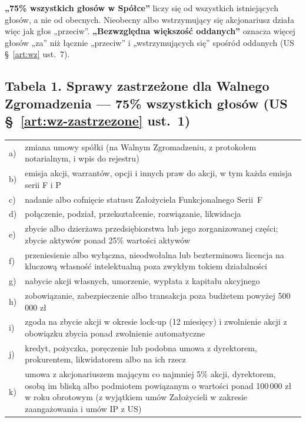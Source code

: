 \documentclass[11pt,a4paper]{report}
\begin{document}
\begin{Zasada}
\textbf{„75\% wszystkich głosów w Spółce”} liczy się od wszystkich istniejących głosów, a nie od obecnych. Nieobecny albo wstrzymujący się akcjonariusz działa więc jak głos „przeciw”. \textbf{„Bezwzględna większość oddanych”} oznacza więcej głosów „za” niż łącznie „przeciw” i „wstrzymujących się” spośród oddanych (US §~\ref{art:wz} ust.~7).
\end{Zasada}

\subsection*{Tabela 1. Sprawy zastrzeżone dla Walnego Zgromadzenia --- 75\% wszystkich głosów (US §~\ref{art:wz-zastrzezone} ust.~1)}
\begin{tabularx}{\linewidth}{@{}p{0.6cm} X@{}}
\toprule
a) & zmiana umowy spółki (na Walnym Zgromadzeniu, z protokołem notarialnym, i wpis do rejestru) \\
b) & emisja akcji, warrantów, opcji i innych praw do akcji, w tym każda emisja serii F i P \\
c) & nadanie albo cofnięcie statusu Założyciela Funkcjonalnego Serii~F \\
d) & połączenie, podział, przekształcenie, rozwiązanie, likwidacja \\
e) & zbycie albo dzierżawa przedsiębiorstwa lub jego zorganizowanej części; zbycie aktywów ponad 25\% wartości aktywów \\
f) & przeniesienie albo wyłączna, nieodwołalna lub bezterminowa licencja na kluczową własność intelektualną poza zwykłym tokiem działalności \\
g) & nabycie akcji własnych, umorzenie, wypłata z kapitału akcyjnego \\
h) & zobowiązanie, zabezpieczenie albo transakcja poza budżetem powyżej 500\,000 zł \\
i) & zgoda na zbycie akcji w okresie lock-up (12 miesięcy) i zwolnienie akcji z obowiązku zbycia ponad zwolnienie automatyczne \\
j) & kredyt, pożyczka, poręczenie lub podobna umowa z dyrektorem, prokurentem, likwidatorem albo na ich rzecz \\
k) & umowa z akcjonariuszem mającym co najmniej 5\% akcji, dyrektorem, osobą im bliską albo podmiotem powiązanym o wartości ponad 100\,000 zł w roku obrotowym (z wyjątkiem umów Założycieli w zakresie zaangażowania i umów IP z US) \\
\bottomrule
\end{tabularx}
\end{document}
